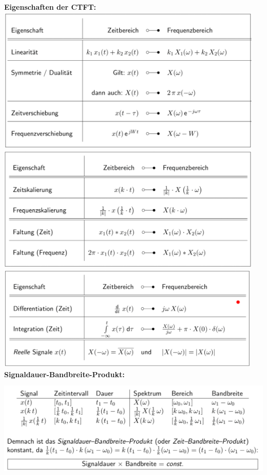 \documentclass[12pt,a4paper]{scrartcl}
\begin{document}
  \noindent \textbf{Eigenschaften der CTFT:}\\
  \includegraphics[height = 7cm]{Pictures/EigenschaftenCTFT.png}\\
  \includegraphics[height = 6cm]{Pictures/EigenschaftenCTFT2.png}\\
  \includegraphics[height = 5cm]{Pictures/EigenschaftenCTFT3.png} \\

  \noindent \textbf{Signaldauer-Bandbreite-Produkt:}\\
  \includegraphics[height=5cm]{Pictures/SignalBand.png} \\
\end{document}
